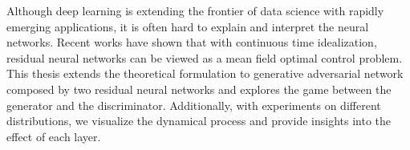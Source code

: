Although deep learning is extending the frontier of data science with rapidly emerging applications, it is often hard to explain and interpret the neural networks. Recent works have shown that with continuous time idealization, residual neural networks can be viewed as a mean field optimal control problem. This thesis extends the theoretical formulation to generative adversarial network composed by two residual neural networks and explores the game between the generator and the discriminator. Additionally, with experiments on different distributions, we visualize the dynamical process and provide insights into the effect of each layer.


